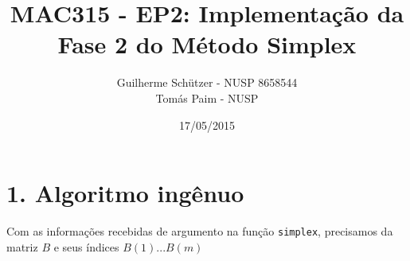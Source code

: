 \documentclass[a4paper]{article}
\title{MAC315 - EP2: Implementação da Fase 2 do Método Simplex}
\author{
	Guilherme Schützer - NUSP 8658544 \\
	Tomás Paim         - NUSP
}
\date{17/05/2015}
\begin{document}
\maketitle

\section{1. Algoritmo ingênuo}
Com as informações recebidas de argumento na função \texttt{simplex}, precisamos da matriz $B$ e seus índices $B(1)...B(m)$
\end{document}
